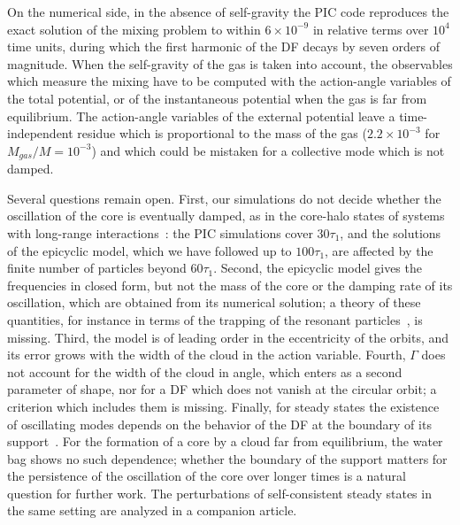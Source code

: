 On the numerical side, in the absence of self-gravity the PIC code reproduces the exact solution of the mixing problem to within $6\times 10^{-9}$ in relative terms over $10^4$ time units, during which the first harmonic of the DF decays by seven orders of magnitude. When the self-gravity of the gas is taken into account, the observables which measure the mixing have to be computed with the action-angle variables of the total potential, or of the instantaneous potential when the gas is far from equilibrium. The action-angle variables of the external potential leave a time-independent residue which is proportional to the mass of the gas ($2.2\times 10^{-3}$ for $M_{gas}/M = 10^{-3}$) and which could be mistaken for a collective mode which is not damped.

Several questions remain open. First, our simulations do not decide whether the oscillation of the core is eventually damped, as in the core-halo states of systems with long-range interactions~\cite{yLrPfRtTfB14}: the PIC simulations cover $30\tau_1$, and the solutions of the epicyclic model, which we have followed up to $100\tau_1$, are affected by the finite number of particles beyond $60\tau_1$. Second, the epicyclic model gives the frequencies in closed form, but not the mass of the core or the damping rate of its oscillation, which are obtained from its numerical solution; a theory of these quantities, for instance in terms of the trapping of the resonant particles~\cite{tO65}, is missing. Third, the model is of leading order in the eccentricity of the orbits, and its error grows with the width of the cloud in the action variable. Fourth, $\Gamma$ does not account for the width of the cloud in angle, which enters as a second parameter of shape, nor for a DF which does not vanish at the circular orbit; a criterion which includes them is missing. Finally, for steady states the existence of oscillating modes depends on the behavior of the DF at the boundary of its support~\cite{mHgRmScS25}. For the formation of a core by a cloud far from equilibrium, the water bag shows no such dependence; whether the boundary of the support matters for the persistence of the oscillation of the core over longer times is a natural question for further work. The perturbations of self-consistent steady states in the same setting are analyzed in a companion article.
